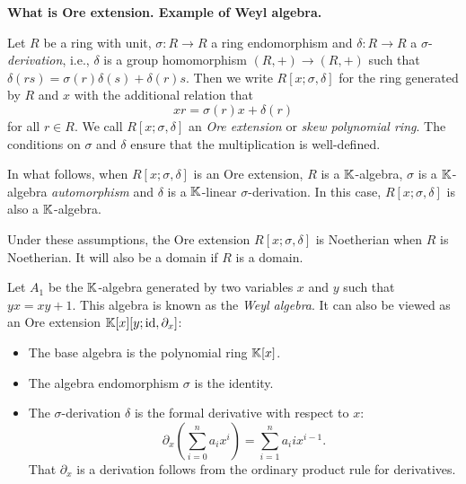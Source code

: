 \textbf{What is Ore extension. Example of Weyl algebra.}
\begin{definition}
	Let $R$ be a ring with unit, $\sigma \colon R \to R$ a ring endomorphism and
	$\delta \colon R \to R$ a $\sigma$-\emph{derivation}, i.e.,
	$\delta$ is a group homomorphism $(R, +) \to (R, +)$ such that $\delta (r s) =
		\sigma(r)\delta(s) + \delta(r) s$. Then we write $R[x;\sigma, \delta]$ for the ring generated by $R$ and $x$ with the additional relation that
	\begin{equation*}
		x r = \sigma(r) x + \delta(r)
	\end{equation*}
	for all $r \in R$. We call $R[x;\sigma, \delta]$ an \emph{Ore extension} or \emph{skew polynomial ring}. The conditions
	on $\sigma$ and $\delta$ ensure that the multiplication is well-defined.
\end{definition}
%
\begin{convention}
	In what follows, when $R[x;\sigma, \delta]$ is an Ore extension, $R$ is a
	$\mathbb{K}$-algebra, $\sigma$ is a $\mathbb{K}$-algebra \emph{automorphism} and $\delta$ is a
	$\mathbb{K}$-linear $\sigma$-derivation. In this case, $R[x;\sigma, \delta]$ is also a
	$\mathbb{K}$-algebra.
\end{convention}
%
Under these assumptions, the Ore extension $R[x; \sigma, \delta]$ is Noetherian when
$R$ is Noetherian. It will also be a domain if $R$ is a domain.

\begin{example}
	Let $A_1$ be the $\mathbb{K}$-algebra generated by two variables $x$ and $y$ such that $yx =
		xy + 1$. This algebra is known as the \emph{Weyl algebra}. It can
	also be viewed as an Ore extension $\mathbb{K}[x][y; \operatorname{id}, \partial_x]$:
	\begin{itemize}
		\item The base algebra is the polynomial ring $\mathbb{K}[x]$.
		\item The algebra endomorphism $\sigma$ is the identity.
		\item The $\sigma$-derivation $\delta$ is the formal derivative with respect to $x$:
		      \begin{equation*}
			      \partial_x \left(\sum_{i=0}^n a_i x^i \right) = \sum_{i=1}^{n} a_i i x^{i-1}.
		      \end{equation*}
		      That $\partial_x$ is a derivation follows from the ordinary product rule for derivatives.
	\end{itemize}
\end{example}


